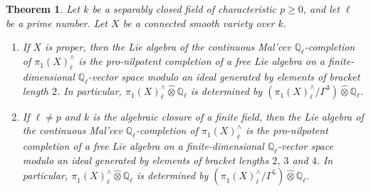 \documentclass[11pt]{amsart}
\newtheorem{theorem}{Theorem}[section]
\theoremstyle{definition}
\numberwithin{equation}{section}
\numberwithin{equation}{section}
\newcommand\QQ{\mathbb{Q}}
\DeclareMathOperator{\et}{\acute{e}t}
\begin{document}
\begin{theorem}\label{Thm: fundamental group of algebraic varieties}
Let $k$ be a separably closed field of characteristic $p\geq 0$, and let $\ell$ be a prime number. Let $X$ be a connected smooth variety over $k$. 
\begin{enumerate}[leftmargin=0.25in]
    \item If $X$ is proper, then the Lie algebra of the continuous Mal'cev $\QQ_{\ell}$-completion of $\pi_1^{\et}(X)^{\wedge}_{\ell}$ is the pro-nilpotent completion of a free Lie algebra on a finite-dimensional $\QQ_{\ell}$-vector space modulo an ideal generated by elements of bracket length $2$. In particular, $\pi_1^{\et}(X)^{\wedge}_{\ell}\widehat{\otimes }\QQ_{\ell}$ is determined by $(\pi_1^{\et}(X)^{\wedge}_{\ell}/\Gamma^3)\widehat{\otimes}\QQ_{\ell}$.
    \item If $\ell\neq p$ and $k$ is the algebraic closure of a finite field, then the Lie algebra of the continuous Mal'cev $\QQ_{\ell}$-completion of  $\pi_1^{\et}(X)^{\wedge}_{\ell}$ is the pro-nilpotent completion of a free Lie algebra on a finite-dimensional $\QQ_{\ell}$-vector space modulo an ideal generated by elements of bracket lengths $2$, $3$ and $4$. In particular, $\pi_1^{\et}(X)^{\wedge}_{\ell}\widehat{\otimes }\QQ_{\ell}$ is determined by $(\pi_1^{\et}(X)^{\wedge}_{\ell}/\Gamma^5)\widehat{\otimes}\QQ_{\ell}$.
\end{enumerate}
\end{theorem}
\end{document}
